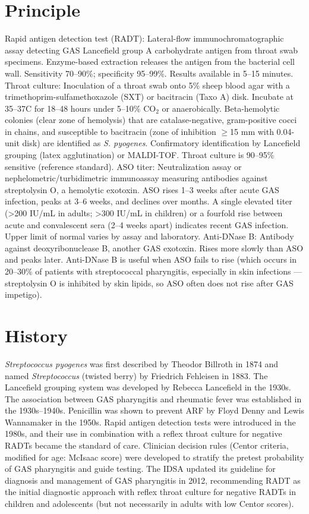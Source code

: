 \section*{Principle}
Rapid antigen detection test (RADT): Lateral-flow immunochromatographic assay detecting GAS Lancefield group A carbohydrate antigen from throat swab specimens. Enzyme-based extraction releases the antigen from the bacterial cell wall. Sensitivity 70--90\%; specificity 95--99\%. Results available in 5--15 minutes. Throat culture: Inoculation of a throat swab onto 5\% sheep blood agar with a trimethoprim-sulfamethoxazole (SXT) or bacitracin (Taxo A) disk. Incubate at 35--37\textdegree{}C for 18--48 hours under 5--10\% CO$_2$ or anaerobically. Beta-hemolytic colonies (clear zone of hemolysis) that are catalase-negative, gram-positive cocci in chains, and susceptible to bacitracin (zone of inhibition $\geq$15 mm with 0.04-unit disk) are identified as \textit{S. pyogenes}. Confirmatory identification by Lancefield grouping (latex agglutination) or MALDI-TOF. Throat culture is 90--95\% sensitive (reference standard). ASO titer: Neutralization assay or nephelometric/turbidimetric immunoassay measuring antibodies against streptolysin O, a hemolytic exotoxin. ASO rises 1--3 weeks after acute GAS infection, peaks at 3--6 weeks, and declines over months. A single elevated titer (>200 IU/mL in adults; >300 IU/mL in children) or a fourfold rise between acute and convalescent sera (2--4 weeks apart) indicates recent GAS infection. Upper limit of normal varies by assay and laboratory. Anti-DNase B: Antibody against deoxyribonuclease B, another GAS exotoxin. Rises more slowly than ASO and peaks later. Anti-DNase B is useful when ASO fails to rise (which occurs in 20--30\% of patients with streptococcal pharyngitis, especially in skin infections --- streptolysin O is inhibited by skin lipids, so ASO often does not rise after GAS impetigo).

\section*{History}
\textit{Streptococcus pyogenes} was first described by Theodor Billroth in 1874 and named \textit{Streptococcus} (twisted berry) by Friedrich Fehleisen in 1883. The Lancefield grouping system was developed by Rebecca Lancefield in the 1930s. The association between GAS pharyngitis and rheumatic fever was established in the 1930s--1940s. Penicillin was shown to prevent ARF by Floyd Denny and Lewis Wannamaker in the 1950s. Rapid antigen detection tests were introduced in the 1980s, and their use in combination with a reflex throat culture for negative RADTs became the standard of care. Clinician decision rules (Centor criteria, modified for age: McIsaac score) were developed to stratify the pretest probability of GAS pharyngitis and guide testing. The IDSA updated its guideline for diagnosis and management of GAS pharyngitis in 2012, recommending RADT as the initial diagnostic approach with reflex throat culture for negative RADTs in children and adolescents (but not necessarily in adults with low Centor scores).

